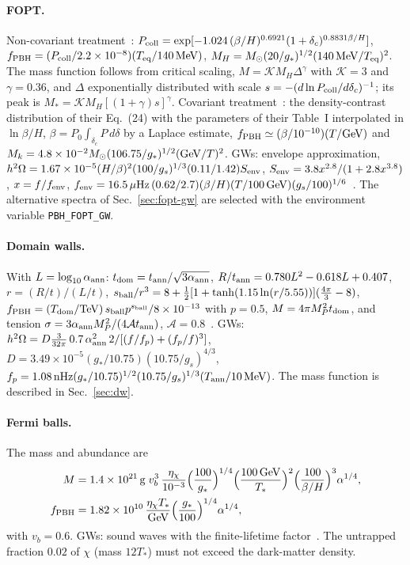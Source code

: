 \documentclass[aps,prd,onecolumn,superscriptaddress,nofootinbib,floatfix]{revtex4-2}
\newcommand{\fpbh}{f_{\rm PBH}}
\newcommand{\Msun}{M_\odot}
\newcommand{\code}[1]{\texttt{#1}}
\begin{document}
\paragraph*{FOPT.}
Non-covariant treatment~\cite{Gouttenoire:2023naa}: $P_{\rm coll}=\exp[-1.024\,(\beta/H)^{0.6921}(1+\delta_c)^{0.8831\beta/H}]$, $\fpbh=(P_{\rm coll}/2.2\times10^{-8})(T_{\rm eq}/140\,{\rm MeV})$, $M_H=\Msun(20/g_\ast)^{1/2}(140\,{\rm MeV}/T_{\rm eq})^2$. The mass function follows from critical scaling, $M=\mathcal{K}M_H\Delta^{\gamma}$ with $\mathcal{K}=3$ and $\gamma=0.36$, and $\Delta$ exponentially distributed with scale $s=-(d\ln P_{\rm coll}/d\delta_c)^{-1}$; its peak is $M_\ast=\mathcal{K}M_H[(1+\gamma)s]^{\gamma}$. Covariant treatment~\cite{Franciolini:2025ztf}: the density-contrast distribution of their Eq.~(24) with the parameters of their Table~I interpolated in $\ln\beta/H$, $\beta=P_0\int_{\delta_c}P\,d\delta$ by a Laplace estimate, $\fpbh\simeq(\beta/10^{-10})(T/{\rm GeV})$ and $M_k=4.8\times10^{-2}\Msun(106.75/g_\ast)^{1/2}({\rm GeV}/T)^2$. GWs: envelope approximation, $h^2\Omega=1.67\times10^{-5}(H/\beta)^2(100/g_s)^{1/3}(0.11/1.42)S_{\rm env}$, $S_{\rm env}=3.8x^{2.8}/(1+2.8x^{3.8})$, $x=f/f_{\rm env}$, $f_{\rm env}=16.5\,\mu{\rm Hz}\,(0.62/2.7)(\beta/H)(T/100\,{\rm GeV})(g_s/100)^{1/6}$~\cite{Caprini:2015zlo}. The alternative spectra of Sec.~\ref{sec:fopt-gw} are selected with the environment variable \code{PBH\_FOPT\_GW}.

\paragraph*{Domain walls.}
With $L=\log_{10}\alpha_{\rm ann}$: $t_{\rm dom}=t_{\rm ann}/\sqrt{3\alpha_{\rm ann}}$, $R/t_{\rm ann}=0.780L^2-0.618L+0.407$, $r=(R/t)/(L/t)$, $s_{\rm ball}/r^3=8+\frac12[1+\tanh(1.15\ln(r/5.55))](\frac{4\pi}3-8)$, $\fpbh=(T_{\rm dom}/{\rm TeV})\,s_{\rm ball}p^{s_{\rm ball}}/8\times10^{-13}$ with $p=0.5$, $M=4\pi M_P^2t_{\rm dom}$, and tension $\sigma=3\alpha_{\rm ann}M_P^2/(4\mathcal{A}t_{\rm ann})$, $\mathcal{A}=0.8$~\cite{Gouttenoire:2023ftk,Gouttenoire:2023gbn}. GWs: $h^2\Omega=D\frac{3}{32\pi}\,0.7\,\alpha_{\rm ann}^2\,2/[(f/f_p)+(f_p/f)^3]$, $D=3.49\times10^{-5}(g_\ast/10.75)(10.75/g_s)^{4/3}$, $f_p=1.08\,{\rm nHz}(g_\ast/10.75)^{1/2}(10.75/g_s)^{1/3}(T_{\rm ann}/10\,{\rm MeV})$. The mass function is described in Sec.~\ref{sec:dw}.

\paragraph*{Fermi balls.}
The mass and abundance are~\cite{Kawana:2021tde}
\begin{align}
M&=1.4\times10^{21}\,{\rm g}\;v_b^3\,\frac{\eta_\chi}{10^{-3}}\Big(\frac{100}{g_\ast}\Big)^{1/4}\Big(\frac{100\,{\rm GeV}}{T_\ast}\Big)^2\Big(\frac{100}{\beta/H}\Big)^3\alpha^{1/4},\nonumber\\
\fpbh&=1.82\times10^{10}\,\frac{\eta_\chi T_\ast}{\rm GeV}\Big(\frac{g_\ast}{100}\Big)^{1/4}\alpha^{1/4},\nonumber
\end{align}
with $v_b=0.6$. GWs: sound waves with the finite-lifetime factor~\cite{Caprini:2015zlo}. The untrapped fraction $0.02$ of $\chi$ (mass $12T_\ast$) must not exceed the dark-matter density.
\end{document}
